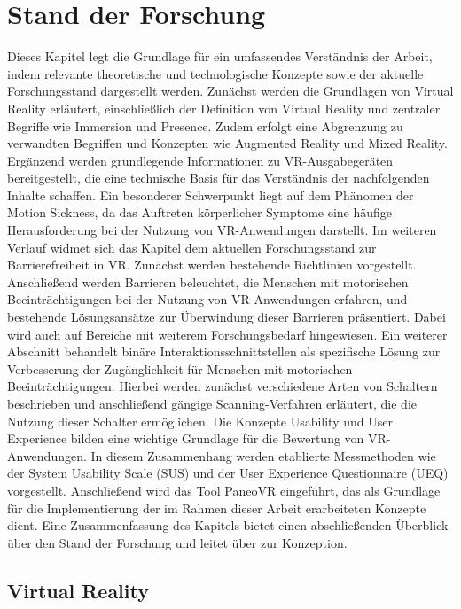 \chapter{Stand der Forschung}
\label{chap:2Stand}

Dieses Kapitel legt die Grundlage für ein umfassendes Verständnis der Arbeit, indem relevante theoretische und technologische Konzepte sowie der aktuelle Forschungsstand dargestellt werden. Zunächst werden die Grundlagen von Virtual Reality erläutert, einschließlich der Definition von Virtual Reality und zentraler Begriffe wie Immersion und Presence. Zudem erfolgt eine Abgrenzung zu verwandten Begriffen und Konzepten wie Augmented Reality und Mixed Reality. Ergänzend werden grundlegende Informationen zu VR-Ausgabegeräten bereitgestellt, die eine technische Basis für das Verständnis der nachfolgenden Inhalte schaffen. Ein besonderer Schwerpunkt liegt auf dem Phänomen der Motion Sickness, da das Auftreten körperlicher Symptome eine häufige Herausforderung bei der Nutzung von VR-Anwendungen darstellt. 
Im weiteren Verlauf widmet sich das Kapitel dem aktuellen Forschungsstand zur Barrierefreiheit in VR. Zunächst werden bestehende Richtlinien vorgestellt. Anschließend werden Barrieren beleuchtet, die Menschen mit motorischen Beeinträchtigungen bei der Nutzung von VR-Anwendungen erfahren, und bestehende Lösungsansätze zur Überwindung dieser Barrieren präsentiert. Dabei wird auch auf Bereiche mit weiterem Forschungsbedarf hingewiesen.
Ein weiterer Abschnitt behandelt binäre Interaktionsschnittstellen als spezifische Lösung zur Verbesserung der Zugänglichkeit für Menschen mit motorischen Beeinträchtigungen. Hierbei werden zunächst verschiedene Arten von Schaltern beschrieben und anschließend gängige Scanning-Verfahren erläutert, die die Nutzung dieser Schalter ermöglichen.
Die Konzepte Usability und User Experience bilden eine wichtige Grundlage für die Bewertung von VR-Anwendungen. In diesem Zusammenhang werden etablierte Messmethoden wie der System Usability Scale (SUS) und der User Experience Questionnaire (UEQ) vorgestellt.
Anschließend wird das Tool PaneoVR eingeführt, das als Grundlage für die Implementierung der im Rahmen dieser Arbeit erarbeiteten Konzepte dient. Eine Zusammenfassung des Kapitels bietet einen abschließenden Überblick über den Stand der Forschung und leitet über zur Konzeption.

\section{Virtual Reality}

